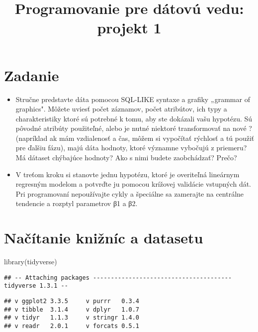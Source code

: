 \documentclass[
]{article}
\title{Programovanie pre dátovú vedu: projekt 1}
\author{}
\date{\vspace{-2.5em}}
\newenvironment{Shaded}{\begin{snugshade}}{\end{snugshade}}
\newcommand{\FunctionTok}[1]{\textcolor[rgb]{0.00,0.00,0.00}{#1}}
\newcommand{\NormalTok}[1]{#1}
\providecommand{\tightlist}{%
  \setlength{\itemsep}{0pt}\setlength{\parskip}{0pt}}
\begin{document}
\maketitle

\hypertarget{zadanie}{%
\section{Zadanie}\label{zadanie}}

\begin{itemize}
\tightlist
\item
  Stručne predstavte dáta pomocou SQL-LIKE syntaxe a grafiky „grammar of
  graphics". Môžete uviesť počet záznamov, počet atribútov, ich typy a
  charakteristiky ktoré sú potrebné k tomu, aby ste dokázali vašu
  hypotézu. Sú pôvodné atribúty použiteľné, alebo je nutné niektoré
  transformovať na nové ? (napríklad ak mám vzdialenosť a čas, môžem si
  vypočítať rýchlosť a tú použiť pre ďalšiu fázu), majú dáta hodnoty,
  ktoré významne vybočujú z priemeru? Má dátaset chýbajúce hodnoty? Ako
  s nimi budete zaobchádzať? Prečo?
\item
  V treťom kroku si stanovte jednu hypotézu, ktoré je overiteľná
  lineárnym regresným modelom a potvrďte ju pomocou krížovej validácie
  vstupných dát. Pri programovaní nepoužívajte cykly a špeciálne sa
  zamerajte na centrálne tendencie a rozptyl parametrov β1 a β2.
\end{itemize}

\hypertarget{naux10duxedtanie-kniux17enuxedc-a-datasetu}{%
\section{Načítanie knižníc a
datasetu}\label{naux10duxedtanie-kniux17enuxedc-a-datasetu}}

\begin{Shaded}
\begin{Highlighting}[]
\FunctionTok{library}\NormalTok{(tidyverse)}
\end{Highlighting}
\end{Shaded}

\begin{verbatim}
## -- Attaching packages --------------------------------------- tidyverse 1.3.1 --
\end{verbatim}

\begin{verbatim}
## v ggplot2 3.3.5     v purrr   0.3.4
## v tibble  3.1.4     v dplyr   1.0.7
## v tidyr   1.1.3     v stringr 1.4.0
## v readr   2.0.1     v forcats 0.5.1
\end{verbatim}
\end{document}
